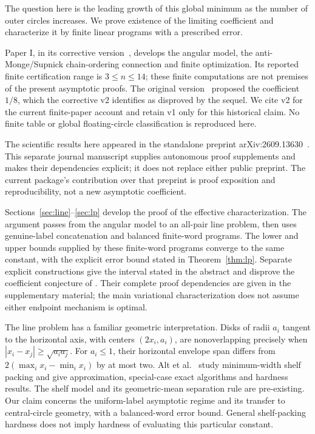 \documentclass[11pt,letterpaper]{article}
\theoremstyle{definition}\newtheorem{definition}[theorem]{Definition}
\theoremstyle{remark}\newtheorem{remark}[theorem]{Remark}
\begin{document}
The question here is the leading growth of this global minimum as the
number of outer circles increases. We prove existence of the limiting
coefficient and characterize it by finite linear programs with a prescribed
error.

Paper I, in its corrective version~\cite{v2}, develops the angular model,
the anti-Monge/Supnick chain-ordering connection and finite optimization.
Its reported finite certification range is $3\le n\le14$; these finite
computations are not premises of the present asymptotic proofs.
The original version~\cite{v1} proposed the coefficient $1/8$, which the
corrective v2 identifies as disproved by the sequel. We cite v2 for the
current finite-paper account and retain v1 only for this historical claim.
No finite table or global floating-circle classification is reproduced here.

The scientific results here appeared in the standalone preprint
arXiv:2609.13630~\cite{preprint}. This separate journal manuscript supplies
autonomous proof supplements and makes their dependencies explicit; it does
not replace either public preprint. The current package's contribution over
that preprint is proof exposition and reproducibility, not a new asymptotic
coefficient.

Sections~\ref{sec:line}--\ref{sec:lp} develop the proof of the effective
characterization. The argument passes from the angular model to an all-pair
line problem, then uses genuine-label concatenation and balanced finite-word
programs. The lower and upper bounds supplied by these finite-word programs
converge to the same constant, with the explicit error bound stated in
Theorem~\ref{thm:lp}. Separate explicit
constructions give the interval stated in the abstract and disprove the
coefficient conjecture of \cite{v1}. Their complete proof dependencies are
given in the supplementary material; the main variational characterization does
not assume either endpoint mechanism is optimal.

The line problem has a familiar geometric interpretation. Disks of radii
$a_i$ tangent to the horizontal axis, with centers $(2x_i,a_i)$, are
nonoverlapping precisely when $|x_i-x_j|\ge\sqrt{a_i a_j}$.
For $a_i\le1$, their horizontal envelope span differs from
$2(\max_i x_i-\min_i x_i)$ by at most two. Alt et al.~\cite{shelf}
study minimum-width shelf packing and give approximation, special-case exact
algorithms and hardness results. The shelf model and its geometric-mean
separation rule are pre-existing. Our claim concerns the uniform-label
asymptotic regime and its transfer to central-circle geometry, with a
balanced-word error bound. General shelf-packing hardness does not imply
hardness of evaluating this particular constant.
\end{document}
